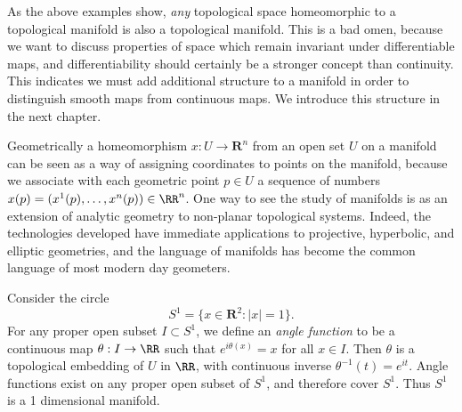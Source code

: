 


\begin{remark}
    As the above examples show, \emph{any} topological space homeomorphic to a topological manifold is also a topological manifold. This is a bad omen, because we want to discuss properties of space which remain invariant under differentiable maps, and differentiability should certainly be a stronger concept than continuity. This indicates we must add additional structure to a manifold in order to distinguish smooth maps from continuous maps. We introduce this structure in the next chapter.
\end{remark}

Geometrically a homeomorphism $x: U \to \mathbf{R}^n$ from an open set $U$ on a manifold can be seen as a way of assigning coordinates to points on the manifold, because we associate with each geometric point $p \in U$ a sequence of numbers $x(p) = (x^1(p), \dots, x^n(p)) \in \RR^n$. One way to see the study of manifolds is as an extension of analytic geometry to non-planar topological systems. Indeed, the technologies developed have immediate applications to projective, hyperbolic, and elliptic geometries, and the language of manifolds has become the common language of most modern day geometers.

\begin{example}
    Consider the circle
    \[ S^1 = \{ x \in \mathbf{R}^2 : |x| = 1 \}. \]
    For any proper open subset $I \subset S^1$, we define an \emph{angle function} to be a continuous map $\theta: I \to \RR$ such that $e^{i\theta(x)} = x$ for all $x \in I$. Then $\theta$ is a topological embedding of $U$ in $\RR$, with continuous inverse $\theta^{-1}(t) = e^{it}$. Angle functions exist on any proper open subset of $S^1$, and therefore cover $S^1$. Thus $S^1$ is a 1 dimensional manifold.
\end{example}

